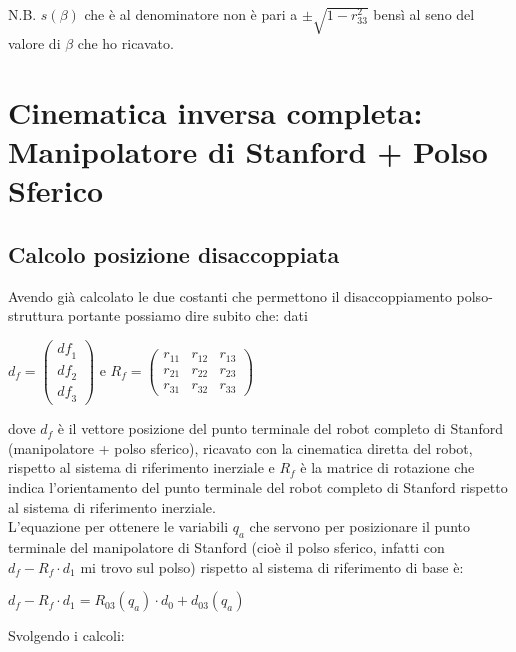 \documentclass[a4paper,12pt]{article}
\begin{document}
N.B. $s(\beta)$ che è al denominatore non è pari a  $\pm \sqrt{1-r_{33}^2}$ bensì al seno del valore di $\beta$ che ho ricavato.

\newpage
\section{Cinematica inversa completa: Manipolatore di Stanford + Polso Sferico}
\subsection{Calcolo posizione disaccoppiata}

Avendo già calcolato le due costanti che permettono il disaccoppiamento polso-struttura portante possiamo dire subito che: dati

\begin{center}
$d_f=\begin{pmatrix}{{\mathit{df}}_1}\\
{{\mathit{df}}_2}\\
{{\mathit{df}}_3}\end{pmatrix}$ e $R_f=\begin{pmatrix}{r_{11}} & {r_{12}} & {r_{13}}\\
{r_{21}} & {r_{22}} & {r_{23}}\\
{r_{31}} & {r_{32}} & {r_{33}}\end{pmatrix}$
\end{center}

\begin{flushleft}
dove $d_f$ è il vettore posizione del punto terminale del robot completo di Stanford (manipolatore + polso sferico), ricavato con la cinematica diretta del robot, rispetto al sistema di riferimento inerziale e $R_f$ è la matrice di rotazione che indica l'orientamento del punto terminale del robot completo di Stanford rispetto al sistema di riferimento inerziale. \\
L'equazione per ottenere le variabili $q_a$ che servono per posizionare il punto terminale del manipolatore di Stanford (cioè il polso sferico, infatti con $d_f- R_f \cdot d_1$ mi trovo sul polso) rispetto al sistema di riferimento di base è:
\end{flushleft}

\begin{center}
$d_f- R_f \cdot d_1 = R_{03}(q_a) \cdot d_0 + d_{03}(q_a)$ 
\end{center}

Svolgendo i calcoli:
\end{document}
